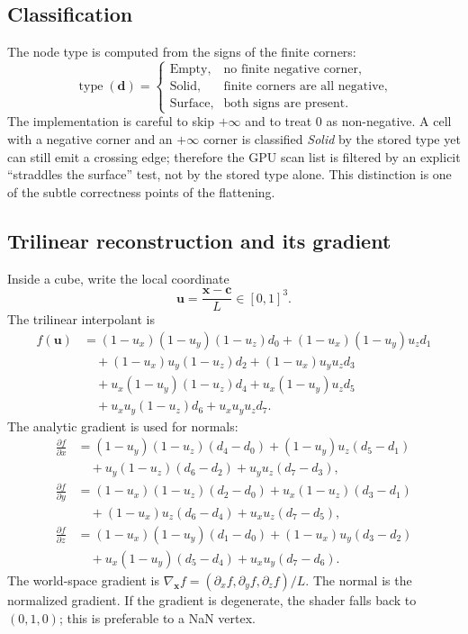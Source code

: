 \subsection{Classification}

The node type is computed from the signs of the finite corners:
\begin{equation}
  \operatorname{type}(\mathbf{d}) =
  \begin{cases}
    \text{Empty}, & \text{no finite negative corner},\\
    \text{Solid}, & \text{finite corners are all negative},\\
    \text{Surface}, & \text{both signs are present}.
  \end{cases}
  \label{eq:type}
\end{equation}
The implementation is careful to skip $+\infty$ and to treat $0$ as
non-negative.  A cell with a negative corner and an $+\infty$ corner is
classified \emph{Solid} by the stored type yet can still emit a crossing
edge; therefore the GPU scan list is filtered by an explicit
``straddles the surface'' test, not by the stored type alone.  This
distinction is one of the subtle correctness points of the flattening.

\subsection{Trilinear reconstruction and its gradient}

Inside a cube, write the local coordinate
\begin{equation}
  \mathbf{u} = \frac{\mathbf{x}-\mathbf{c}}{L}\in[0,1]^3.
\end{equation}
The trilinear interpolant is
\begin{align}
  f(\mathbf{u}) &=
    (1-u_x)(1-u_y)(1-u_z)d_0
  + (1-u_x)(1-u_y)u_z d_1 \nonumber\\
  &\quad + (1-u_x)u_y(1-u_z)d_2
  + (1-u_x)u_y u_z d_3 \nonumber\\
  &\quad + u_x(1-u_y)(1-u_z)d_4
  + u_x(1-u_y)u_z d_5 \nonumber\\
  &\quad + u_x u_y(1-u_z)d_6
  + u_x u_y u_z d_7 .
\end{align}
The analytic gradient is used for normals:
\begin{align}
  \frac{\partial f}{\partial x} &=
    (1-u_y)(1-u_z)(d_4-d_0)
  + (1-u_y)u_z(d_5-d_1) \nonumber\\
  &\quad + u_y(1-u_z)(d_6-d_2)
  + u_y u_z(d_7-d_3),\\
  \frac{\partial f}{\partial y} &=
    (1-u_x)(1-u_z)(d_2-d_0)
  + u_x(1-u_z)(d_3-d_1) \nonumber\\
  &\quad + (1-u_x)u_z(d_6-d_4)
  + u_x u_z(d_7-d_5),\\
  \frac{\partial f}{\partial z} &=
    (1-u_x)(1-u_y)(d_1-d_0)
  + (1-u_x)u_y(d_3-d_2) \nonumber\\
  &\quad + u_x(1-u_y)(d_5-d_4)
  + u_x u_y(d_7-d_6).
\end{align}
The world-space gradient is $\nabla_{\mathbf{x}} f =
(\partial_x f,\partial_y f,\partial_z f)/L$.  The normal is the normalized
gradient.  If the gradient is degenerate, the shader falls back to
$(0,1,0)$; this is preferable to a NaN vertex.

